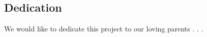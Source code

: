 \begin{center}
    \section*{Dedication}
\end{center}
We would like to dedicate this project to our loving parents . . .